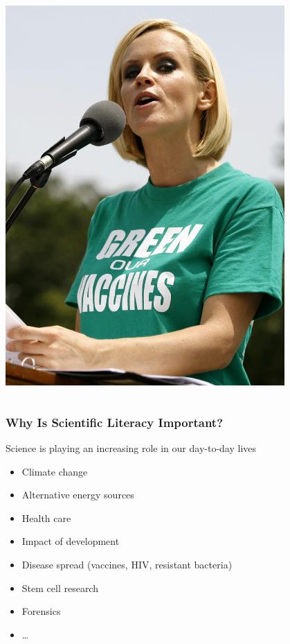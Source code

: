 \documentclass[10pt]{beamer}
\begin{document}
\begin{frame}
\begin{columns}
		\begin{column}{0.3\textwidth}
			\begin{center}
				\includegraphics[width=0.8\textwidth]{figures/jenny.jpg}
			\end{center}
		\end{column}
	\end{columns}
\end{frame}


\begin{frame}[t]
\frametitle{Why Is Scientific Literacy Important?}
\vspace{0.5cm}

	Science is playing an increasing role in our day-to-day lives\\
		\begin{itemize}
			\item Climate change
			\medskip
			\item Alternative energy sources
			\medskip
			\item Health care
			\medskip
			\item Impact of development
			\medskip
			\item Disease spread (vaccines, HIV, resistant bacteria)
			\medskip
			\item Stem cell research
			\medskip
			\item Forensics
			\medskip
			\item \ldots
		\end{itemize}
\end{frame}
\end{document}
